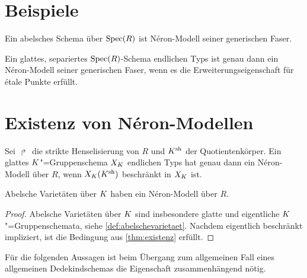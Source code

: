 \documentclass[german]{scrreprt}
\begin{document}

\section{Beispiele}

\begin{Satz}
  Ein abelsches Schema über $\operatorname{Spec}(R)$ ist Néron-Modell seiner
  generischen Faser.
  \cite[1.2, Proposition 8]{neron}
\end{Satz}

\begin{Satz}
  Ein glattes, separiertes $\operatorname{Spec}(R)$-Schema endlichen Typs ist genau
  dann ein Néron-Modell seiner generischen Faser, wenn es die
  Erweiterungseigenschaft für étale Punkte erfüllt.
  \cite[1.2, Criterion 9]{neron}
\end{Satz}


\section{Existenz von Néron-Modellen}

\begin{Satz}\label{thm:existenz}
  Sei $\Rsh$ die strikte Henselisierung von $R$ und $K^{\text{sh}}$ der
  Quotientenkörper. Ein glattes $K$"=Gruppenschema $X_{K}$ endlichen
  Typs hat genau dann ein Néron-Modell über $R$, wenn $X_{K}(K^{\text{sh}})$
  beschränkt in $X_{K}$ ist.
  \cite[1.3, Theorem 1]{neron}
\end{Satz}
\begin{Korollar}\label{thm:exneronmodellabvarietaet}
  Abelsche Varietäten über $K$ haben ein Néron-Modell über $R$.
  \begin{proof}
    Abelsche Varietäten über $K$ sind insbesondere glatte und
    eigentliche $K$"=Gruppenschemata, siehe
    \autoref{def:abelschevarietaet}.
    Nachdem eigentlich beschränkt impliziert, ist die Bedingung aus
    \autoref{thm:existenz} erfüllt.
  \end{proof}
\end{Korollar}

Für die folgenden Aussagen ist beim Übergang zum allgemeinen Fall
eines allgemeinen Dedekindschemas die Eigenschaft zusammenhängend
nötig.
\end{document}
